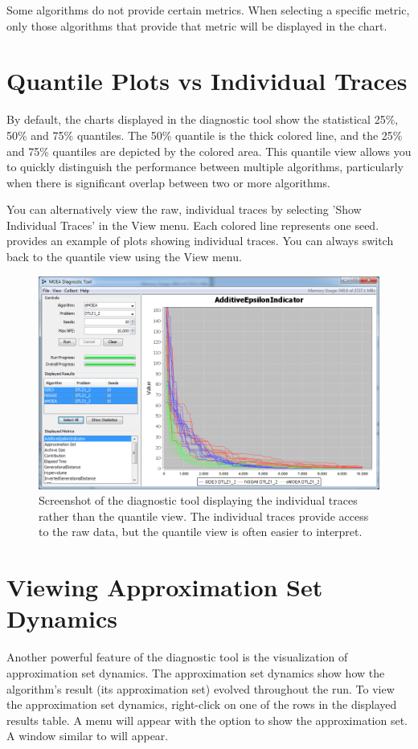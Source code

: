 \begin{tip}
  Some algorithms do not provide certain metrics.  When selecting a specific metric, only those algorithms that provide that metric will be displayed in the chart.
\end{tip}

\section{Quantile Plots vs Individual Traces}
By default, the charts displayed in the diagnostic tool show the statistical 25\%, 50\% and 75\% quantiles.  The 50\% quantile is the thick colored line, and the 25\% and 75\% quantiles are depicted by the colored area.  This quantile view allows you to quickly distinguish the performance between multiple algorithms, particularly when there is significant overlap between two or more algorithms.

You can alternatively view the raw, individual traces by selecting 'Show Individual Traces' in the View menu.  Each colored line represents one seed.   provides an example of plots showing individual traces.  You can always switch back to the quantile view using the View menu.

\begin{figure}
  \includegraphics[width=\linewidth]{diagnosticToolTraces.png}
  \caption{Screenshot of the diagnostic tool displaying the individual traces rather than the quantile view.  The individual traces provide access to the raw data, but the quantile view is often easier to interpret.}
  \label{fig:diagnosticToolTraces}
\end{figure}

\section{Viewing Approximation Set Dynamics}
Another powerful feature of the diagnostic tool is the visualization of approximation set dynamics.  The approximation set dynamics show how the algorithm's result (its approximation set) evolved throughout the run.  To view the approximation set dynamics, right-click on one of the rows in the displayed results table.  A menu will appear with the option to show the approximation set.  A window similar to  will appear.

